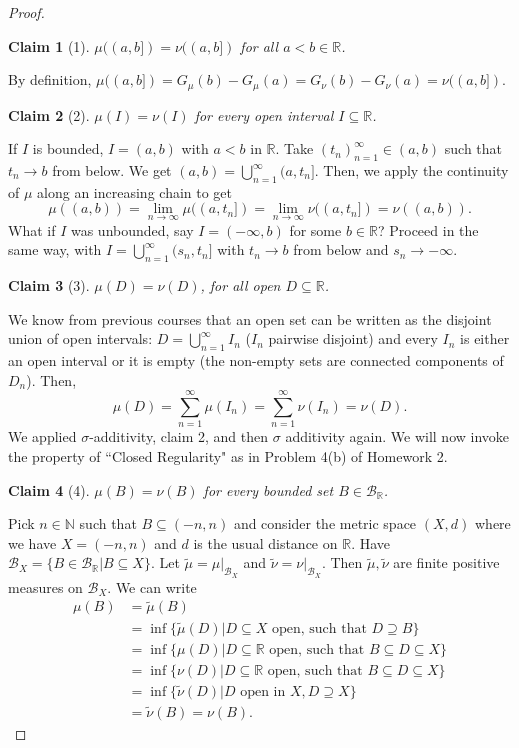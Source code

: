 \documentclass[letterpaper, 12pt]{article}
\newcommand{\cB}{\mathcal{B}}
\newcommand{\bR}{\mathbb{R}}
\newcommand{\bN}{\mathbb{N}}
\theoremstyle{stdthm}
\theoremstyle{stddef}
\theoremstyle{stdnonum}
\newtheorem{claim}{Claim}
\theoremstyle{stdqands}
\theoremstyle{stdbold}
\begin{document}
\begin{proof}
\begin{claim}[1]
$\mu((a,b]) = \nu((a,b])$ for all $a<b \in \bR$.
\end{claim}

\noindent By definition, $\mu((a,b]) = G_\mu(b) - G_\mu(a) = G_\nu(b) - G_\nu(a) = \nu((a,b])$. 

\begin{claim}[2]
$\mu(I) = \nu(I)$ for every open interval $I \subseteq \bR$. 
\end{claim}
\noindent If $I$ is bounded, $I = (a,b)$ with $a<b$ in $\bR$. Take $(t_n)_{n=1}^\infty \in (a,b)$ such that $t_n \rightarrow b$ from below. We get $(a,b) = \bigcup_{n=1}^\infty (a,t_n]$.  Then, we apply the continuity of $\mu$ along an increasing chain to get
\[
\mu((a,b)) = \lim_{n\rightarrow \infty} \mu((a,t_n])
= \lim_{n\rightarrow \infty} \nu((a,t_n])
= \nu((a,b)).
\]
What if $I$ was unbounded, say $I = (-\infty,b)$ for some $b \in \bR$? Proceed in the same way, with $I= \bigcup_{n=1}^\infty (s_n,t_n]$ with $t_n \rightarrow b$ from below and $s_n \rightarrow -\infty$.

\begin{claim}[3]
$\mu(D) = \nu(D)$, for all open $D \subseteq \bR$. 
\end{claim} 
We know from previous courses that an open set can be written as the disjoint union of open intervals: $D = \bigcup_{n=1}^\infty I_n$ ($I_n$ pairwise disjoint) and every $I_n$ is either an open interval or it is empty (the non-empty sets are connected components of $D_n$). Then, 
\[
\mu(D) = \sum_{n=1}^\infty \mu(I_n)
= \sum_{n=1}^\infty \nu(I_n)
= \nu(D).
\]
We applied $\sigma$-additivity, claim 2, and then $\sigma$ additivity again. We will now invoke the property of ``Closed Regularity" as in Problem 4(b) of Homework 2. 

\begin{claim}[4]
$\mu(B) = \nu(B)$ for every bounded set $B \in \cB_\bR$. 
\end{claim}

Pick $n \in \bN$ such that $B \subseteq (-n,n)$  and consider the metric space $(X,d)$ where we have $X = (-n,n)$ and $d$ is the usual distance on $\bR$. Have $\cB_X = \{B \in \cB_\bR|B \subseteq X\}$. Let $\tilde{\mu} = \mu |_{\cB_X}$ and $\tilde{\nu} = \nu|_{\cB_X}$. Then $\tilde{\mu},\tilde{\nu}$ are finite positive measures on $\cB_X$. We can write
\begin{align*}
\mu(B) &= \tilde{\mu}(B) \\
&= \inf \{ \tilde{\mu}(D) | D\subseteq X \text{ open, such that } D\supseteq B\}\\
&= \inf \{ \mu(D) | D\subseteq \bR \text{ open, such that } B \subseteq D \subseteq X \}\\
&= \inf \{ \nu(D) | D \subseteq \bR \text{ open, such that } B \subseteq D \subseteq X \}\\
&= \inf\{ \tilde{\nu}(D) | D \text{ open in } X, D \supseteq X\}\\
&= \tilde{\nu}(B) = \nu(B).
\end{align*}


\end{proof}
\end{document}
